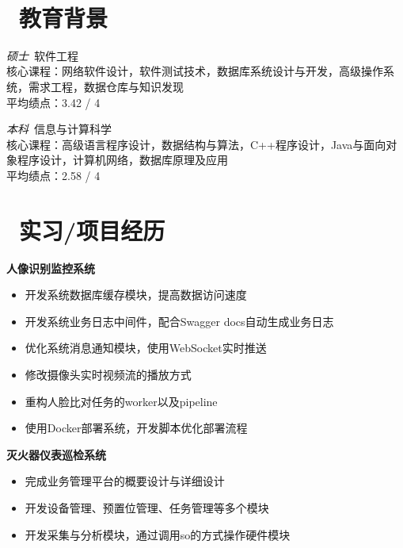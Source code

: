 \documentclass{resume}
\begin{document}


  \centerline { \textperiodcentered\ 
  }

\section{\faGraduationCap\ 教育背景}
\textit{硕士}\ 软件工程
\\核心课程：网络软件设计，软件测试技术，数据库系统设计与开发，高级操作系统，需求工程，数据仓库与知识发现
\\平均绩点：3.42 / 4

\textit{本科}\ 信息与计算科学
\\核心课程：高级语言程序设计，数据结构与算法，C++程序设计，Java与面向对象程序设计，计算机网络，数据库原理及应用
\\平均绩点：2.58 / 4

\section{\faBriefcase\ 实习/项目经历}
\textbf{人像识别监控系统}
\begin{itemize}
  \item 开发系统数据库缓存模块，提高数据访问速度
  \item 开发系统业务日志中间件，配合Swagger docs自动生成业务日志
  \item 优化系统消息通知模块，使用WebSocket实时推送
  \item 修改摄像头实时视频流的播放方式
  \item 重构人脸比对任务的worker以及pipeline
  \item 使用Docker部署系统，开发脚本优化部署流程
\end{itemize}

\textbf{灭火器仪表巡检系统}
\begin{itemize}
  \item 完成业务管理平台的概要设计与详细设计
  \item 开发设备管理、预置位管理、任务管理等多个模块
  \item 开发采集与分析模块，通过调用so的方式操作硬件模块
\end{itemize}
\end{document}
